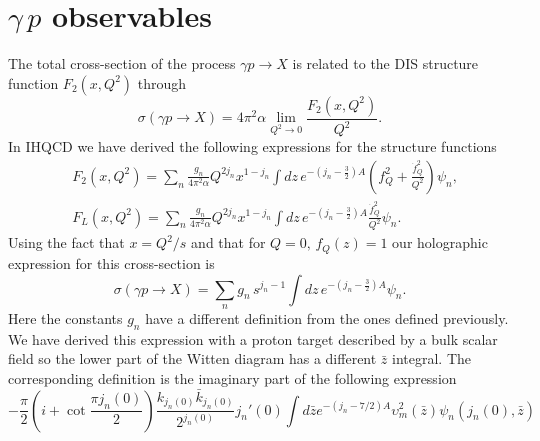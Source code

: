 \documentclass[preprint, 12pt]{elsarticle}
\begin{document}
\section{$\gamma\, p$ observables}

The total cross-section of the process $\gamma p \rightarrow X$ is related to the DIS structure function $F_2\left(x, Q^2\right)$ through
\begin{equation}
\sigma\left(\gamma p \rightarrow X\right) = 4 \pi^2 \alpha \lim_{Q^2 \rightarrow 0} \frac{F_2\left(x, Q^2\right)}{Q^2}.
\end{equation}
In IHQCD we have derived the following expressions for the structure functions
\begin{align}
&F_2(x, Q^2) = \sum_{n} \frac{g_n}{4 \pi^2 \alpha} Q^{2 j_n} x^{1-j_n} \int dz \,e^{-\left(j_n-\frac{3}{2}\right)A}  \left( f_Q^2  +  \frac{\dot{f}_Q^{2}}{Q^2}      \right) \psi_n , \\
&F_L(x, Q^2) = \sum_{n} \frac{g_n}{4 \pi^2 \alpha} Q^{2 j_n} x^{1-j_n} \int dz \,e^{-\left(j_n-\frac{3}{2}\right)A}  \frac{\dot{f}_Q^{2}}{Q^2}  \psi_n.
\end{align}
Using the fact that $x = Q^2 / s$ and that for $Q = 0, \, f_Q\left(z\right) = 1$ our holographic expression for this cross-section is
\begin{equation}
\sigma\left(\gamma p \rightarrow X\right) =  \sum_{n} g_n \, s^{j_n -1 } \int dz \,e^{-\left(j_n-\frac{3}{2}\right)A}  \psi_n.
\end{equation}
Here the constants $g_n$ have a different definition from the ones defined previously. We have derived this expression with a proton target described by a bulk scalar field so the lower part of the Witten diagram has a different $\bar{z}$ integral. The corresponding definition is the imaginary part of the following expression
\begin{equation}
- \frac{\pi}{2} \left( i + \cot \frac{\pi j_n\left(0\right)}{2} \right) \frac{k_{j_n\left(0\right)}\bar{k}_{j_n\left(0\right)}}{2^{j_n\left(0\right)}} j_n'\left(0\right) \int d\bar{z} e^{- \left(j_n - 7/2\right) A} \upsilon_m^2\left(\bar{z}\right) \psi_n \left(j_n\left(0\right), \bar{z}\right)
\end{equation}











































\end{document}
